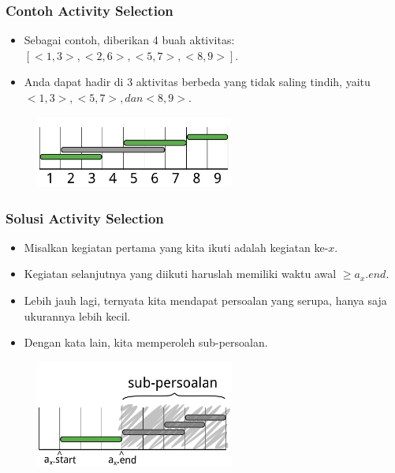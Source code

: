 \begin{frame}
  \frametitle{Contoh Activity Selection}
  \begin{itemize}
    \item Sebagai contoh, diberikan 4 buah aktivitas: $[ <1, 3> , <2, 6>, <5, 7>,  <8, 9> ]$. \item Anda dapat hadir di 3 aktivitas berbeda yang tidak saling tindih, yaitu $<1, 3>, <5, 7>, dan <8, 9>$.
  \end{itemize}

  \begin{figure}
    \includegraphics[width=6.5cm]{asset/activity-selection.pdf}
  \end{figure}
\end{frame}

\begin{frame}
  \frametitle{Solusi Activity Selection}
  \begin{itemize}
    \item Misalkan kegiatan pertama yang kita ikuti adalah kegiatan ke-$x$.
    \item Kegiatan selanjutnya yang diikuti haruslah memiliki waktu awal $\geq a_x.end$.
    \item Lebih jauh lagi, ternyata kita mendapat persoalan yang serupa, hanya saja ukurannya lebih kecil.
    \item Dengan kata lain, kita memperoleh sub-persoalan.
  \end{itemize}

  \begin{figure}
    \includegraphics[width=6.5cm]{asset/activity-selection-subproblem.pdf}
  \end{figure}
\end{frame}

